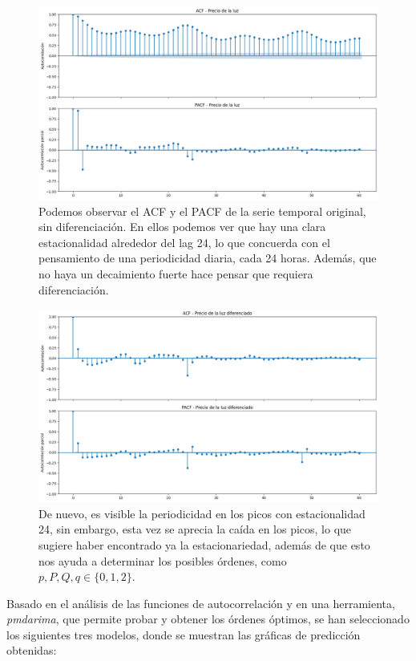 \begin{figure}[H]
    \centering
    \includegraphics[width=0.7\linewidth]{figuras/ACFPACFdD0.png}
    \caption[ACF y PACF serie temporal original.]{Podemos observar el ACF y el PACF de la serie temporal original, sin diferenciación. En ellos podemos ver que hay una clara estacionalidad alrededor del lag 24, lo que concuerda con el pensamiento de una periodicidad diaria, cada 24 horas. Además, que no haya un decaimiento fuerte hace pensar que requiera diferenciación.}
    \label{ACFPACFDd0}
\end{figure}
\begin{figure}[H]
    \centering
    \includegraphics[width=0.7\linewidth]{figuras/ACFPACFdD1.png}
    \caption[ACF y PACF serie temporal diferenciada $d=D=1$.]{De nuevo, es visible la periodicidad en los picos con estacionalidad 24, sin embargo, esta vez se aprecia la caída en los picos, lo que sugiere haber encontrado ya la estacionariedad, además de que esto nos ayuda a determinar los posibles órdenes, como $p,P,Q,q \in \{0,1,2\} $.}
    \label{ACFPACFDd1}
\end{figure}

Basado en el análisis de las funciones de autocorrelación y en una herramienta, \textit{pmdarima}, que permite probar y obtener los órdenes óptimos, se han seleccionado los siguientes tres modelos, donde se muestran las gráficas de predicción obtenidas:

